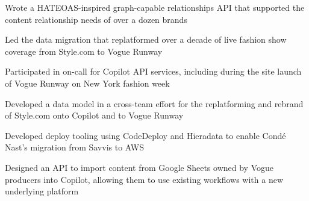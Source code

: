 \begin{job}

  \begin{accomplishments}
    \item Wrote a HATEOAS-inspired graph-capable relationships API that
    supported the content relationship needs of over a dozen brands
    \item Led the data migration that replatformed over a decade of live fashion
    show coverage from Style.com to Vogue Runway
    \item Participated in on-call for Copilot API services, including during the
    site launch of Vogue Runway on New York fashion week
  \end{accomplishments}
  \begin{extendedaccomplishments}
    \item Developed a data model in a cross-team effort for the replatforming
    and rebrand of Style.com onto Copilot and to Vogue Runway
    \item Developed deploy tooling using CodeDeploy and Hieradata to enable
    Cond\'{e} Nast's migration from Savvis to AWS
    \item Designed an API to import content from Google Sheets owned by Vogue
    producers into Copilot, allowing them to use existing workflows with a new
    underlying platform
  \end{extendedaccomplishments}
\end{job}
